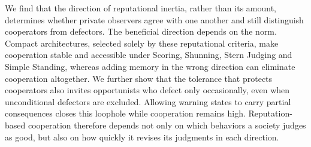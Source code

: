\documentclass[11pt]{article}
\begin{document}
We find that the direction of reputational inertia, rather than its amount, determines whether private observers agree with one another and still distinguish cooperators from defectors. The beneficial direction depends on the norm. Compact architectures, selected solely by these reputational criteria, make cooperation stable and accessible under Scoring, Shunning, Stern Judging and Simple Standing, whereas adding memory in the wrong direction can eliminate cooperation altogether. We further show that the tolerance that protects cooperators also invites opportunists who defect only occasionally, even when unconditional defectors are excluded. Allowing warning states to carry partial consequences closes this loophole while cooperation remains high. Reputation-based cooperation therefore depends not only on which behaviors a society judges as good, but also on how quickly it revises its judgments in each direction.



\end{document}
